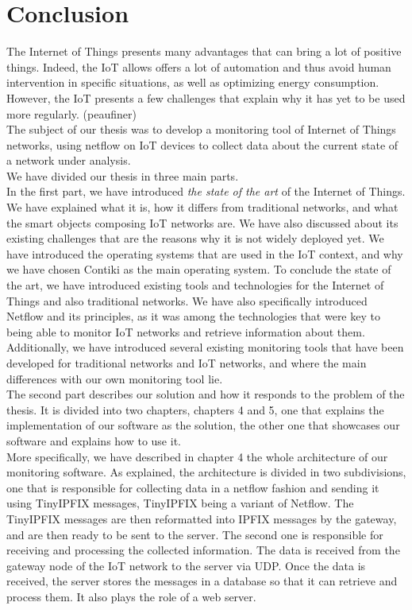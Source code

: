 \chapter*{Conclusion}

The Internet of Things presents many advantages that can bring a lot of positive things. Indeed, the IoT allows offers a lot of automation and thus avoid human intervention in specific situations, as well as optimizing energy consumption. However, the IoT presents a few challenges that explain why it has yet to be used more regularly. (peaufiner)\\

The subject of our thesis was to develop a monitoring tool of Internet of Things networks, using netflow on IoT devices to collect data about the current state of a network under analysis.\\

We have divided our thesis in three main parts.\\

In the first part, we have introduced \textit{the state of the art} of the Internet of Things. We have explained what it is, how it differs from traditional networks, and what the smart objects composing IoT networks are. We have also discussed about its existing challenges that are the reasons why it is not widely deployed yet. We have introduced the operating systems that are used in the IoT context, and why we have chosen Contiki as the main operating system. To conclude the state of the art, we have introduced existing tools and technologies for the Internet of Things and also traditional networks. We have also specifically introduced Netflow and its principles, as it was among the technologies that were key to being able to monitor IoT networks and retrieve information about them. Additionally, we have introduced several existing monitoring tools that have been developed for traditional networks and IoT networks, and where the main differences with our own monitoring tool lie.\\

The second part describes our solution and how it responds to the problem of the thesis. It is divided into two chapters, chapters 4 and 5, one that explains the implementation of our software as the solution, the other one that showcases our software and explains how to use it.\\

More specifically, we have described in chapter 4 the whole architecture of our monitoring software. As explained, the architecture is divided in two subdivisions, one that is responsible for collecting data in a netflow fashion and sending it using TinyIPFIX messages, TinyIPFIX being a variant of Netflow. The TinyIPFIX messages are then reformatted into IPFIX messages by the gateway, and are then ready to be sent to the server. The second one is responsible for receiving and processing the collected information. The data is received from the gateway node of the IoT network to the server via UDP. Once the data is received, the server stores the messages in a database so that it can retrieve and process them. It also plays the role of a web server. \\


